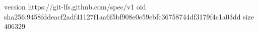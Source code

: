 version https://git-lfs.github.com/spec/v1
oid sha256:9458fddeacf2adf41127f1aa6f5bf908e0e59ebfc36758744df3179f4c1a03dd
size 406329
